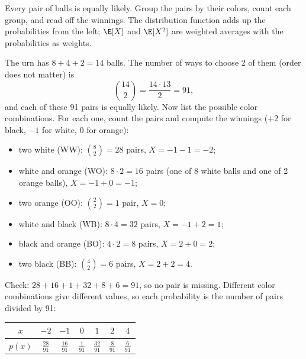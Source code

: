 \begin{solution}
	\idea Every pair of balls is equally likely. Group the pairs by their colors,
	count each group, and read off the winnings. The distribution function adds
	up the probabilities from the left; $\E[X]$ and $\E[X^2]$ are weighted
	averages with the probabilities as weights.

	 The urn has $8+4+2=14$ balls. The number of ways to choose 2 of
	them (order does not matter) is
	\[ \binom{14}{2}=\frac{14\cdot13}{2}=91, \]
	and each of these 91 pairs is equally likely. Now list the possible color
	combinations. For each one, count the pairs and compute the winnings
	($+2$ for black, $-1$ for white, $0$ for orange):
	\begin{itemize}
		\item two white (WW): $\binom82=28$ pairs, $X=-1-1=-2$;
		\item white and orange (WO): $8\cdot2=16$ pairs (one of 8 white balls
		      and one of 2 orange balls), $X=-1+0=-1$;
		\item two orange (OO): $\binom22=1$ pair, $X=0$;
		\item white and black (WB): $8\cdot4=32$ pairs, $X=-1+2=1$;
		\item black and orange (BO): $4\cdot2=8$ pairs, $X=2+0=2$;
		\item two black (BB): $\binom42=6$ pairs, $X=2+2=4$.
	\end{itemize}
	Check: $28+16+1+32+8+6=91$, so no pair is missing. Different color
	combinations give different values, so each probability is the number of
	pairs divided by 91:
	\begin{center}
		\renewcommand{\arraystretch}{1.3}
		\begin{tabular}{c|cccccc}
			$x$      & $-2$ & $-1$ & $0$ & $1$ & $2$ & $4$ \\
			\hline
			$p(x)$   & $\frac{28}{91}$ & $\frac{16}{91}$ & $\frac{1}{91}$
			         & $\frac{32}{91}$ & $\frac{8}{91}$ & $\frac{6}{91}$
		\end{tabular}
	\end{center}


\end{solution}
